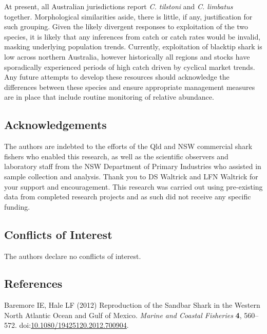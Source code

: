 \documentclass[]{article}
\begin{document}
At present, all Australian jurisdictions report \emph{C. tilstoni} and
\emph{C. limbatus} together. Morphological similarities aside, there is
little, if any, justification for such grouping. Given the likely
divergent responses to exploitation of the two species, it is likely
that any inferences from catch or catch rates would be invalid, masking
underlying population trends. Currently, exploitation of blacktip shark
is low across northern Australia, however historically all regions and
stocks have sporadically experienced periods of high catch driven by
cyclical market trends. Any future attempts to develop these resources
should acknowledge the differences between these species and ensure
appropriate management measures are in place that include routine
monitoring of relative abundance.

\subsection{Acknowledgements}\label{acknowledgements}

The authors are indebted to the efforts of the Qld and NSW commercial
shark fishers who enabled this research, as well as the scientific
observers and laboratory staff from the NSW Department of Primary
Industries who assisted in sample collection and analysis. Thank you to
DS Waltrick and LFN Waltrick for your support and encouragement. This
research was carried out using pre-existing data from completed research
projects and as such did not receive any specific funding.

\subsection{Conflicts of Interest}\label{conflicts-of-interest}

The authors declare no conflicts of interest.

\newpage

\subsection*{References}\label{references}

\hypertarget{refs}{}
\hypertarget{ref-baremore_reproduction_2012}{}
Baremore IE, Hale LF (2012) Reproduction of the Sandbar Shark in the
Western North Atlantic Ocean and Gulf of Mexico. \emph{Marine and
Coastal Fisheries} \textbf{4}, 560--572.
doi:\href{https://doi.org/10.1080/19425120.2012.700904}{10.1080/19425120.2012.700904}.
\end{document}

